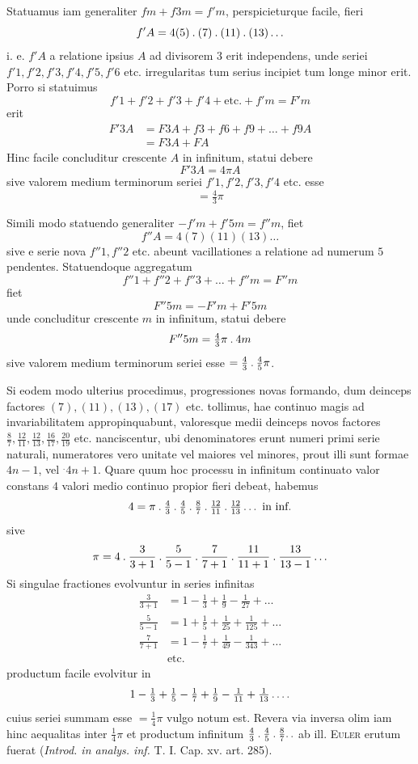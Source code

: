 Statuamus iam generaliter $fm+f3m=f'm$, perspicieturque facile, fieri
\[
f'A=4(5)\mathbin{.}(7)\mathbin{.}(11)\mathbin{.}(13)\ldots
\]
%
i. e. $f'A$ a relatione ipsius $A$ ad divisorem $3$ erit independens, unde seriei $f'1,f'2,f'3,f'4,f'5,f'6$ etc. irregularitas tum serius incipiet tum longe minor erit. Porro si statuimus
\[
f'1+f'2+f'3+f'4+\text{etc.}+f'm=F'm
\]
erit
\[
\begin{aligned}
F'3A&=F3A+f3+f6+f9+\ldots+f9A\\
&=F3A+FA
\end{aligned}
\]
Hinc facile concluditur crescente $A$ in infinitum, statui debere
\[
F'3A=4\pi A
\]
sive valorem medium terminorum seriei $f'1,f'2,f'3,f'4$ etc. esse
\[
=\tfrac43\pi
\]

Simili modo statuendo generaliter $-f'm+f'5m=f''m$, fiet
\[
f''A=4(7)(11)(13)\ldots
\]
sive e serie nova $f''1,f''2$ etc. abeunt vacillationes a relatione ad numerum $5$ pendentes. Statuendoque aggregatum
\[
f''1+f''2+f''3+\ldots+f''m=F''m
\]
fiet
\[
F''5m=-F'm+F'5m
\]
unde concluditur crescente $m$ in infinitum, statui debere
\[
F''5m=\tfrac43\pi\mathbin{.}4m
\]
sive valorem medium terminorum seriei esse $=\tfrac43\mathbin{.}\tfrac45\pi$.

Si eodem modo ulterius procedimus, progressiones novas formando, dum deinceps factores $(7),(11),(13),(17)$ etc. tollimus, hae continuo magis ad invariabilitatem appropinquabunt, valoresque medii deinceps novos factores $\tfrac87,\tfrac{12}{11},\tfrac{12}{13},\tfrac{16}{17},\tfrac{20}{19}$ etc. nanciscentur, ubi denominatores erunt numeri primi serie naturali, numeratores vero unitate vel maiores vel minores, prout illi sunt formae $4n-1$, vel ${}^{.}4n+1$. Quare quum hoc processu in infinitum continuato valor 
%
constans $4$ valori medio continuo propior fieri debeat, habemus
\[
4=\pi\mathbin{.}\tfrac43\mathbin{.}\tfrac45\mathbin{.}\tfrac87\mathbin{.}\tfrac{12}{11}\mathbin{.}\tfrac{12}{13}\ldots\text{ in inf.}
\]
sive
\[
\pi=4\mathbin{.}\frac3{3+1}\mathbin{.}\frac5{5-1}\mathbin{.}\frac7{7+1}\mathbin{.}\frac{11}{11+1}\mathbin{.}\frac{13}{13-1}\ldots
\]
Si singulae fractiones evolvuntur in series infinitas
\[
\begin{aligned}
\frac3{3+1}&=1-\frac13+\frac19-\frac1{27}+\ldots\\
\frac5{5-1}&=1+\frac15+\frac1{25}+\frac1{125}+\ldots\\
\frac7{7+1}&=1-\frac17+\frac1{49}-\frac1{343}+\ldots\\
&\text{etc.}
\end{aligned}
\]
productum facile evolvitur in
\[
1-\tfrac13+\tfrac15-\tfrac17+\tfrac19-\tfrac1{11}+\tfrac1{13}\mathinner{.\,.\,.\,.}
\]
cuius seriei summam esse $=\tfrac14\pi$ vulgo notum est. Revera via inversa olim iam hinc aequalitas inter $\tfrac14\pi$ et productum infinitum $\tfrac43\mathbin{.}\tfrac45\mathbin{.}\tfrac87\ldotp\ldotp$ ab ill. \textsc{Euler} erutum fuerat (\emph{Introd. in analys. inf.} T. I. Cap. xv. art. 285).

